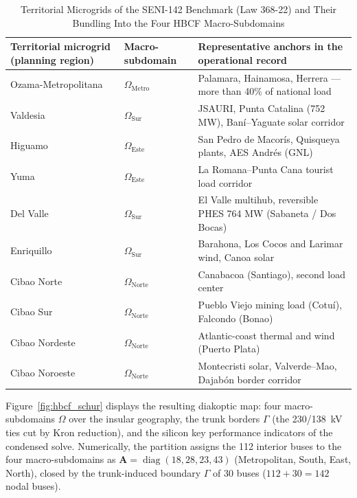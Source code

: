 \begin{table}[!t]
\caption{Territorial Microgrids of the SENI-142 Benchmark (Law 368-22) and Their Bundling Into the Four HBCF Macro-Subdomains}
\label{tab:microgrids}
\centering
\footnotesize
\begin{tabular}{@{}p{} l p{}@{}}
\toprule
\textbf{Territorial microgrid (planning region)} & \textbf{Macro-subdomain} & \textbf{Representative anchors in the operational record} \\
\midrule
Ozama-Metropolitana & $\Omega_{\mathrm{Metro}}$ & Palamara, Hainamosa, Herrera --- more than 40\% of national load \\
Valdesia & $\Omega_{\mathrm{Sur}}$ & JSAURI, Punta Catalina (752 MW), Ban\'i--Yaguate solar corridor \\
Higuamo & $\Omega_{\mathrm{Este}}$ & San Pedro de Macor\'is, Quisqueya plants, AES Andr\'es (GNL) \\
Yuma & $\Omega_{\mathrm{Este}}$ & La Romana--Punta Cana tourist load corridor \\
Del Valle & $\Omega_{\mathrm{Sur}}$ & El Valle multihub, reversible PHES 764 MW (Sabaneta / Dos Bocas) \\
Enriquillo & $\Omega_{\mathrm{Sur}}$ & Barahona, Los Cocos and Larimar wind, Canoa solar \\
Cibao Norte & $\Omega_{\mathrm{Norte}}$ & Canabacoa (Santiago), second load center \\
Cibao Sur & $\Omega_{\mathrm{Norte}}$ & Pueblo Viejo mining load (Cotu\'i), Falcondo (Bonao) \\
Cibao Nordeste & $\Omega_{\mathrm{Norte}}$ & Atlantic-coast thermal and wind (Puerto Plata) \\
Cibao Noroeste & $\Omega_{\mathrm{Norte}}$ & Montecristi solar, Valverde--Mao, Dajab\'on border corridor \\
\bottomrule
\end{tabular}
\end{table}

Figure~\ref{fig:hbcf_schur} displays the resulting diakoptic map: four macro-subdomains $\Omega$ over the insular geography, the trunk borders $\Gamma$ (the 230/138~kV ties cut by Kron reduction), and the silicon key performance indicators of the condensed solve. Numerically, the partition assigns the 112 interior buses to the four macro-subdomains as $\mathbf{A} = \operatorname{diag}(18, 28, 23, 43)$ (Metropolitan, South, East, North), closed by the trunk-induced boundary $\Gamma$ of 30 buses ($112 + 30 = 142$ nodal buses).

